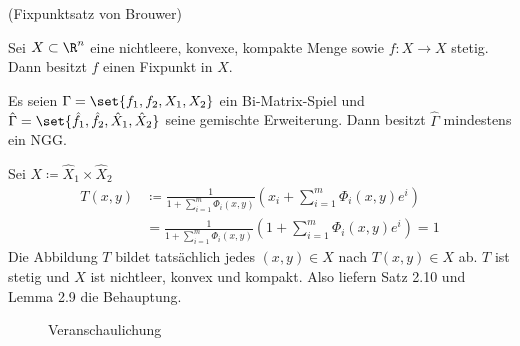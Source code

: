 \begin{satz}(Fixpunktsatz von Brouwer)

Sei $X \subset \R^{n}$ eine nichtleere, konvexe, kompakte Menge sowie $f: X \to X$ stetig. Dann besitzt $f$ einen Fixpunkt in $X$.
\end{satz}
\begin{korollar}
  Es seien $\Gamma = \set{f_{1}, f_{2}, X_{1}, X_{2}}$ ein Bi-Matrix-Spiel und $\hat\Gamma = \set{\hat f_{1},\hat f_{2},\hat X_{1},\hat X_{2}}$ seine gemischte Erweiterung. Dann besitzt $\hat\Gamma$ mindestens ein NGG.
\end{korollar}
\begin{beweis}
  Sei $X \coloneqq \hat X_{1} \times \hat X_{2}$
  \begin{align*}
T(x, y) &\coloneqq  \frac 1 {1 + \sum_{i = 1}^{m}\Phi_{i}(x, y)}\left(x_{i} + \sum_{i = 1}^{m}\Phi_{i}(x, y)e^{i}\right)\\
&= \frac 1 {1 + \sum_{i = 1}^{m}\Phi_{i}(x, y)}\left(1 + \sum_{i = 1}^{m}\Phi_{i}(x, y)e^{i}\right) = 1
  \end{align*}
Die Abbildung $T$ bildet tatsächlich jedes $(x, y) \in X$ nach $T(x, y) \in X$ ab. $T$ ist stetig und $X$ ist nichtleer, konvex und kompakt. Also liefern Satz 2.10 und Lemma 2.9 die Behauptung.
\begin{figure}[h!]
  \centering
  \caption{Veranschaulichung}
  \label{fig:pic}
\end{figure}
\end{beweis}

